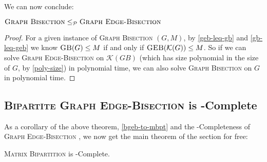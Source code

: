 \documentclass{article}
\newcommand{\mbpt}{\textsc{Matrix \allowbreak Bipartition} }
\newcommand{\gb}{\textsc{Graph \allowbreak Bisection} }
\newcommand{\geb}{\textsc{Graph \allowbreak Edge-\allowbreak Bisection} }
\newcommand{\bgeb}{
	\textsc{Bipartite \allowbreak Graph \allowbreak Edge-\allowbreak Bisection}
 }
\newcommand{\sgeb}{\textsc{GEB} }
\newcommand{\sgb}{\textsc{GB} }
\begin{document}
	We can now conclude:

	\begin{theorem}
		$\gb \leq_{\mathcal{P}} \geb$
	\end{theorem}
	\begin{proof}
		For a given instance of \gb $(G, M)$, by \ref{geb-leq-gb} and
		\ref{gb-leq-geb} we know
		$\sgb(G) \leq M$ if and only if $\sgeb(\mathcal{K}(G)) \leq M$. So
		if we can solve \geb on $\mathcal{K}(GB)$ (which has size polynomial
		in the size of $G$, by \ref{poly-size}) in polynomial time, we can
		also solve \gb on $G$ in polynomial time.
	\end{proof}

	\subsection{\bgeb is \NP-Complete}

	As a corollary of the above theorem, \ref{bgeb-to-mbpt} and the
	\NP-Completeness of \geb, we now get the main theorem of the section
	for free:

	\begin{theorem}
		\mbpt is \NP-Complete.
	\end{theorem}
	
\end{document}
